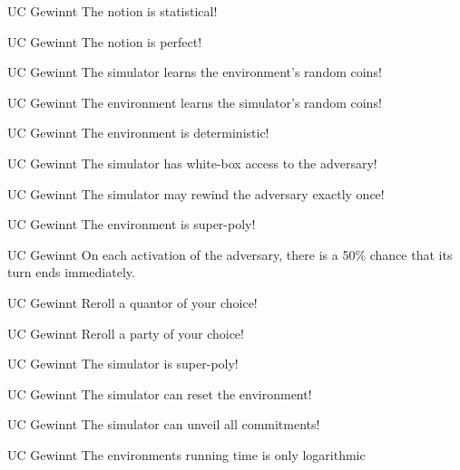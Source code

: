 \documentclass[avery5371,frame,grid]{flashcards}
\newcommand{\stopcard}{\\ \vspace{2em} \Huge \Stopsign}
\begin{document}

\begin{flashcard}{UC Gewinnt}
  The notion is statistical!
  \stopcard
\end{flashcard}
\begin{flashcard}{UC Gewinnt}
  The notion is perfect!
  \stopcard
\end{flashcard}
\begin{flashcard}{UC Gewinnt}
  The simulator learns the environment's random coins!
  \stopcard
\end{flashcard}
\begin{flashcard}{UC Gewinnt}
  The environment learns the simulator's random coins!
  \stopcard
\end{flashcard}
\begin{flashcard}{UC Gewinnt}
  The environment is deterministic!
  \stopcard
\end{flashcard}
\begin{flashcard}{UC Gewinnt}
  The simulator has white-box access to the adversary!
  \stopcard
\end{flashcard}
\begin{flashcard}{UC Gewinnt}
  The simulator may rewind the adversary exactly once!
  \stopcard
\end{flashcard}
\begin{flashcard}{UC Gewinnt}
  The environment is super-poly!
  \stopcard
\end{flashcard}
\begin{flashcard}{UC Gewinnt}
  On each activation of the adversary, there is a 50\% chance that its turn ends immediately. 
  \stopcard
\end{flashcard}
\begin{flashcard}{UC Gewinnt}
  Reroll a quantor of your choice!
  \stopcard
\end{flashcard}
\begin{flashcard}{UC Gewinnt}
  Reroll a party of your choice!
  \stopcard
\end{flashcard}
\begin{flashcard}{UC Gewinnt}
  The simulator is super-poly!
  \stopcard
\end{flashcard}
\begin{flashcard}{UC Gewinnt}
  The simulator can reset the environment!
  \stopcard
\end{flashcard}
\begin{flashcard}{UC Gewinnt}
  The simulator can unveil all commitments!
  \stopcard
\end{flashcard}
\begin{flashcard}{UC Gewinnt}
  The environments running time is only logarithmic
  \stopcard
\end{flashcard}
\end{document}
